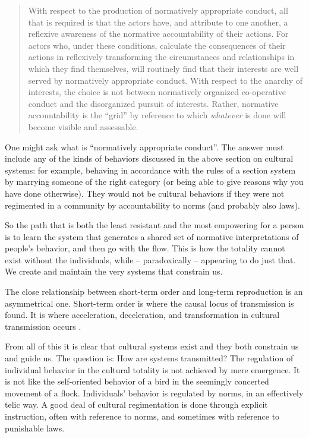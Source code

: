 \begin{quotation}
With respect to the production of normatively appropriate conduct, all 
that is required is that the actors have, and attribute to one another, 
a reflexive awareness of the normative accountability of their actions. 
For actors who, under these conditions, calculate the consequences of 
their actions in reflexively transforming the circumstances and 
relationships in which they find themselves, will routinely find that 
their interests are well served by normatively appropriate conduct. With 
respect to the anarchy of interests, the choice is not between 
normatively organized co-operative conduct and the disorganized pursuit 
of interests. Rather, normative accountability is the ``grid'' by 
reference to which \textit{whatever} is done will become visible and 
assessable. \citep[117]{heritage_garfinkel_1984}
\end{quotation}



One might ask what is ``normatively appropriate conduct''. The answer must 
include any of the kinds of behaviors discussed in the above section on 
cultural systems: for example, behaving in accordance with the rules of 
a section system by marrying someone of the right category (or being 
able to give reasons why you have done otherwise). They would 
not be cultural behaviors if they were not regimented in a community by 
accountability to norms (and probably also laws). 



So the path that is both the least resistant and the most empowering for 
a person is to learn the system that generates a shared set of 
normative interpretations of people's behavior, and then go with the 
flow. This is how the totality cannot exist without the individuals, 
while -- paradoxically -- appearing to do just that. We create and maintain the very systems that constrain us.



The close relationship between short-term order and long-term 
reproduction is an asymmetrical one. Short-term order is where the 
causal locus of transmission is found. It is where acceleration, 
deceleration, and transformation in cultural transmission occurs 
\citep{schelling_micromotives_1978,sperber_anthropology_1985,sperber_explaining_1996,rogers_diffusion_2003}. 



From all of this it is clear that cultural systems exist and they both 
constrain us and guide us. The question is: How are systems transmitted? The regulation of individual behavior in the cultural 
totality is not achieved by mere emergence. It is not like the self-oriented behavior of a bird 
in the seemingly concerted movement of a flock. Individuals' behavior 
is regulated by norms, in an effectively telic way. A good deal of 
cultural regimentation is done through explicit instruction, often with 
reference to norms, and sometimes with reference to punishable laws. 



